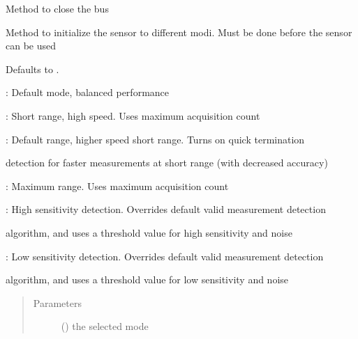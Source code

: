 \documentclass[letterpaper,10pt,english]{sphinxmanual}
\begin{document}
\begin{fulllineitems}
\begin{fulllineitems}
\label{\detokenize{sensor:lib.sensor.Sensor.close}}
Method to close the bus

\end{fulllineitems}


\begin{fulllineitems}
\label{\detokenize{sensor:lib.sensor.Sensor.configure}}
Method to initialize the sensor to different modi. Must be done before the sensor can be used

  Defaults to .

\begin{DUlineblock}{0em}
\item[] : Default mode, balanced performance
\item[] : Short range, high speed. Uses  maximum acquisition count
\item[] : Default range, higher speed short range. Turns on quick termination
\item[]
\begin{DUlineblock}{\DUlineblockindent}
\item[] detection for faster measurements at short range (with decreased accuracy)
\end{DUlineblock}
\item[] : Maximum range. Uses  maximum acquisition count
\item[] : High sensitivity detection. Overrides default valid measurement detection
\item[]
\begin{DUlineblock}{\DUlineblockindent}
\item[] algorithm, and uses a threshold value for high sensitivity and noise
\end{DUlineblock}
\item[] : Low sensitivity detection. Overrides default valid measurement detection
\item[]
\begin{DUlineblock}{\DUlineblockindent}
\item[] algorithm, and uses a threshold value for low sensitivity and noise
\end{DUlineblock}
\end{DUlineblock}
\begin{quote}\begin{description}
\item[{Parameters}] \leavevmode
{} () \textendash{} the selected mode


\end{description}
\end{quote}
\end{fulllineitems}
\end{fulllineitems}
\end{document}
